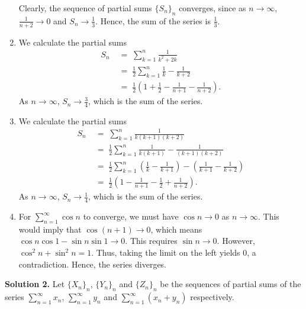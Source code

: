 \documentclass[10pt]{article}
\begin{document}
\begin{enumerate}
                        Clearly, the sequence of partial sums $\{S_n\}_n$ converges, since as $n \to \infty$, $\frac{1}{n + 2} \to 0$
                        and $S_n \to \frac{1}{3}$. Hence, the sum of the series is $\frac{1}{3}$.
                \item We calculate the partial sums
                        \begin{align*}
                                S_n \;&=\; \sum_{k = 1}^n \frac{1}{k^2 + 2k} \\
                                        \;&=\; \frac{1}{2}\sum_{k = 1}^n \frac{1}{k} - \frac{1}{k + 2} \\
                                        \;&=\; \frac{1}{2} \left( 1 + \frac{1}{2} - \frac{1}{n + 1} - \frac{1}{n + 2} \right).
                        \end{align*}
                        As $n \to \infty$, $S_n \to \frac{3}{4}$, which is the sum of the series.
                \item We calculate the partial sums
                        \begin{align*}
                                S_n \;&=\; \sum_{k = 1}^n \frac{1}{k(k + 1)(k + 2)} \\
                                        \;&=\; \frac{1}{2}\sum_{k = 1}^n \frac{1}{k(k + 1)} - \frac{1}{(k + 1)(k + 2)} \\
                                        \;&=\; \frac{1}{2}\sum_{k = 1}^n \left(\frac{1}{k} - \frac{1}{k + 1}\right) - \left(\frac{1}{k + 1} - \frac{1}{k + 2}\right) \\
                                        \;&=\; \frac{1}{2} \left( 1 - \frac{1}{n + 1} - \frac{1}{2} + \frac{1}{n + 2} \right).
                        \end{align*}
                        As $n \to \infty$, $S_n \to \frac{1}{4}$, which is the sum of the series.
                \item For $\sum_{n = 1}^\infty \cos{n}$ to converge, we must have $\cos{n} \to 0$ as $n \to \infty$. This would imply
                        that $\cos(n + 1) \to 0$, which means $\cos{n}\cos{1} - \sin{n}\sin{1} \to 0$. This requires $\sin{n} \to 0$.
                        However, $\cos^2{n} + \sin^2{n} = 1$. Thus, taking the limit on the left yields $0$, a contradiction.
                        Hence, the series diverges.
        \end{enumerate}

        \textbf{Solution 2.}
        Let $\{X_n\}_n$, $\{Y_n\}_n$ and $\{Z_n\}_n$ be the sequences of partial sums of the series $\sum_{n = 1}^\infty x_n$,
        $\sum_{n = 1}^\infty y_n$ and $\sum_{n = 1}^\infty (x_n + y_n)$ respectively.
\end{document}
